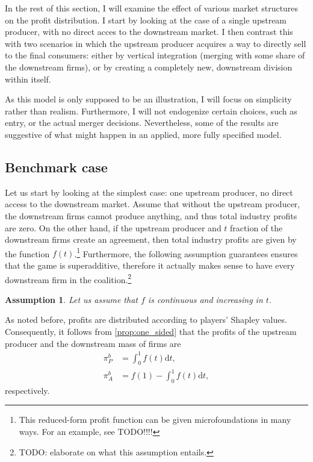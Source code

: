\documentclass[a4paper]{article}
\newtheorem{assumption}{Assumption}
\newcommand{\dt}{\mathrm{d}t}
\begin{document}
In the rest of this section, I will examine the effect of various market structures on the profit distribution.
I start by looking at the case of a single upstream producer, with no direct acces to the downstream market.
I then contrast this with two scenarios in which the upstream producer acquires a way to directly sell to the final consumers: either by vertical integration (merging with some share of the downstream firms), or by creating a completely new, downstream division within itself.

As this model is only supposed to be an illustration, I will focus on simplicity rather than realism.
Furthermore, I will not endogenize certain choices, such as entry, or the actual merger decisions.
Nevertheless, some of the results are suggestive of what might happen in an applied, more fully specified model.


\subsection{Benchmark case}

Let us start by looking at the simplest case: one upstream producer, no direct access to the downstream market.
Assume that without the upstream producer, the downstream firms cannot produce anything, and thus total industry profits are zero.
On the other hand, if the upstream producer and $t$ fraction of the downstream firms create an agreement, then total industry profits are given by the function $f(t)$.\footnote{
    This reduced-form profit function can be given microfoundations in many ways.
    For an example, see TODO!!!!
}
Furthermore, the following assumption guarantees ensures that the game is superadditive, therefore it actually makes sense to have every downstream firm in the coalition.\footnote{
    TODO: elaborate on what this assumption entails.
}
\begin{assumption}
    Let us assume that $f$ is continuous and increasing in $t$.
\end{assumption}

As noted before, profits are distributed according to players' Shapley values.
Consequently, it follows from \cref{prop:one_sided} that the profits of the upstream producer and the downstream mass of firms are
\begin{align*}
    \pi_P^b & = \int_0^1 f(t) \dt, \\
    \pi_A^b & = f(1) - \int_0^1 f(t) \dt,
\end{align*}
respectively.
\end{document}
